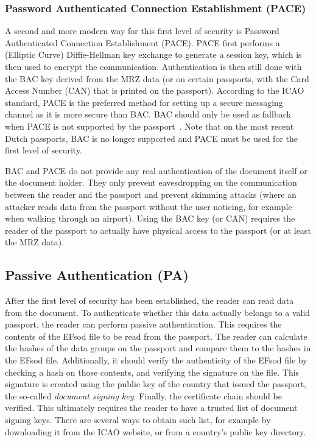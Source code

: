 \subsubsection{Password Authenticated Connection Establishment (PACE)}\label{subsubsec:password-authenticated-connection-establishment}
A second and more modern way for this first level of security is Password Authenticated Connection Establishment (PACE).
PACE first performs a (Elliptic Curve) Diffie-Hellman key exchange to generate a session key, which is then used to encrypt the communication.
Authentication is then still done with the BAC key derived from the MRZ data (or on certain passports, with the Card Access Number (CAN) that is printed on the passport).
According to the ICAO standard, PACE is the preferred method for setting up a secure messaging channel as it is more secure than BAC.
BAC should only be used as fallback when PACE is not supported by the passport~\cite{icao9303securitymechanisms}.
Note that on the most recent Dutch passports, BAC is no longer supported and PACE must be used for the first level of security.


BAC and PACE do not provide any real authentication of the document itself or the document holder.
They only prevent eavesdropping on the communication between the reader and the passport and prevent skimming attacks (where an attacker reads data from the passport without the user noticing, for example when walking through an airport).
Using the BAC key (or CAN) requires the reader of the passport to actually have physical access to the passport (or at least the MRZ data).

\subsection{Passive Authentication (PA)}\label{subsec:passive-authentication}
After the first level of security has been established, the reader can read data from the document.
To authenticate whether this data actually belongs to a valid passport, the reader can perform passive authentication.
This requires the contents of the EFsod file to be read from the passport.
The reader can calculate the hashes of the data groups on the passport and compare them to the hashes in the EFsod file.
Additionally, it should verify the authenticity of the EFsod file by checking a hash on those contents, and verifying the signature on the file.
This signature is created using the public key of the country that issued the passport, the so-called \textit{document signing key}.
Finally, the certificate chain should be verified.
This ultimately requires the reader to have a trusted list of document signing keys.
There are several ways to obtain such list, for example by downloading it from the ICAO website, or from a country's public key directory.


